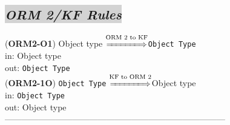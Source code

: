 \documentclass[sn-mathphys]{sn-jnl}
\begin{document}
{{{%





\subsection{\colorbox{lightgray}{\em ORM 2/KF Rules}}

({\bf ORM2-O1}) Object type $\overset{\text{ORM 2 to KF}}{\xLongrightarrow{\hspace*{1.4cm}}}${\tt Object Type}\\
\hspace*{0.3cm}in: Object type\\
\hspace*{0.5cm}out: {\tt Object Type}\\

({\bf ORM2-1O}) {\tt Object Type} $\overset{\text{KF to ORM 2}}{\xLongrightarrow{\hspace*{1.4cm}}}${Object type}\\
\hspace*{0.3cm}in: {\tt Object Type}\\
\hspace*{0.5cm}out: {Object type}\\

------------------------------------------------------------------------------
\\ \


}}}
\end{document}
